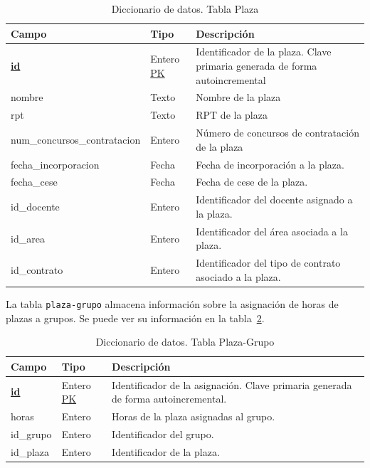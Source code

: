 \begin{table}
  \centering 
  \begin{tabular}{l p{} p{}}
    \toprule
    \textbf{Campo} & \textbf{Tipo} & \textbf{Descripción}\\
    \midrule
    \textbf{\underline{id}} & Entero \underline{PK} & Identificador de la plaza. Clave primaria generada de forma autoincremental \\ \addlinespace
    nombre & Texto & Nombre de la plaza \\ \addlinespace
    rpt & Texto & RPT de la plaza \\ \addlinespace
    num\_concursos\_contratacion & Entero & Número de concursos de contratación de la plaza \\ \addlinespace
    fecha\_incorporacion & Fecha & Fecha de incorporación a la plaza. \\ \addlinespace
    fecha\_cese & Fecha & Fecha de cese de la plaza. \\ \addlinespace
    id\_docente & Entero & Identificador del docente asignado a la plaza. \\ \addlinespace
    id\_area & Entero & Identificador del área asociada a la plaza. \\ \addlinespace
    id\_contrato & Entero & Identificador del tipo de contrato asociado a la plaza. \\
    \bottomrule
  \end{tabular}
  \caption{Diccionario de datos. Tabla Plaza}
  \label{tab:diccionario_plaza}
\end{table}

La tabla \texttt{plaza-grupo} almacena información sobre la asignación de horas de plazas a grupos. 
Se puede ver su información en la tabla~\ref{tab:diccionario_plaza_grupo}.

\begin{table}
  \centering 
  \begin{tabular}{l p{} p{}}
    \toprule
    \textbf{Campo} & \textbf{Tipo} & \textbf{Descripción}\\
    \midrule
    \textbf{\underline{id}} & Entero \underline{PK} & Identificador de la asignación. Clave primaria generada de forma autoincremental. \\ \addlinespace
    horas & Entero & Horas de la plaza asignadas al grupo. \\ \addlinespace
    id\_grupo & Entero & Identificador del grupo. \\ \addlinespace
    id\_plaza & Entero & Identificador de la plaza. \\
    \bottomrule
  \end{tabular}
  \caption{Diccionario de datos. Tabla Plaza-Grupo}
  \label{tab:diccionario_plaza_grupo}
\end{table}

